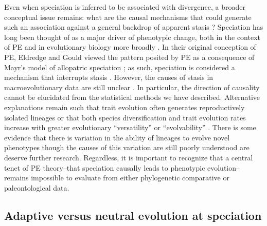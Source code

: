 Even when speciation is inferred to be associated with divergence, a broader conceptual issue remains: what are the causal mechanisms that could generate such an association against a general backdrop of apparent stasis \citep{BentonPearson2001, Eldredge2005}? Speciation has long been thought of as a major driver of phenotypic change, both in the context of PE and in evolutionary biology more broadly \citep{Saetre2013}. In their original conception of PE, Eldredge and Gould \citep{Eldredge1971, EldredgeGould1972} viewed the pattern posited by PE as a consequence of Mayr's model of allopatric speciation \citep{Mayr}; as such, speciation is considered a mechanism that interrupts stasis \citep{Futuyma1987, Futuyma2010}. However, the causes of stasis in macroevolutionary data are still unclear \citep{Futuyma2010, HansenHoule2004, EstesArnold2007, WalshBlows2009}. In particular, the direction of causality cannot be elucidated from the statistical methods we have described. Alternative explanations remain such that trait evolution often generates reproductively isolated lineages or that both species diversification and trait evolution rates increase with greater evolutionary ``versatility'' or ``evolvability'' \citep{Vermeij1973, Adamowicz2008, Rabosky2013}. There is some evidence that there is variation in the ability of lineages to evolve novel phenotypes \citep{Liem1975, Martin2011} though the causes of this variation are still poorly understood are deserve further research.  Regardless, it is important to recognize that a central tenet of PE theory--that speciation causally leads to phenotypic evolution--remains impossible to evaluate from either phylogenetic comparative or paleontological data. 

\subsection{Adaptive versus neutral evolution at speciation}

